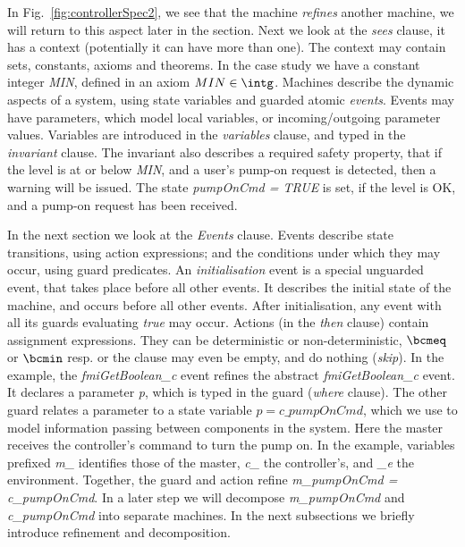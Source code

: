 \documentclass{llncs}%
\begin{document}
 In Fig.~\ref{fig:controllerSpec2}, we see that the machine \emph{refines} another machine, we will return to this aspect later in the section. Next we look at the \emph{sees} clause, it has a context (potentially it can have more than one). The context may contain sets, constants, axioms and theorems. In the case study we have a constant integer \emph{MIN}, defined in an axiom $MIN \in \intg$. Machines describe the dynamic aspects of a system, using state variables and guarded atomic \emph{events}. Events may have parameters, which model local variables, or incoming/outgoing parameter values. Variables are introduced in the \emph{variables} clause, and typed in the \emph{invariant} clause. The invariant also describes a required safety property, that if the level is at or below \emph{MIN}, and a user's pump-on request is detected, then a warning will be issued. The state \emph{pumpOnCmd = TRUE} is set, if the level is OK, and a pump-on request has been received.

In the next section we look at the \emph{Events} clause. Events describe state transitions, using action expressions; and the conditions under which they may occur, using guard predicates. An \emph{initialisation} event is a special unguarded event, that takes place before all other events. It describes the initial state of the machine, and occurs before all other events. After initialisation, any event with all its guards evaluating \emph{true} may occur. Actions (in the \emph{then} clause) contain assignment expressions. They can be deterministic or non-deterministic, $\bcmeq$ or $\bcmin$ resp. or the clause may even be empty, and do nothing (\emph{skip}). In the example, the \emph{fmiGetBoolean\_c} event refines the abstract \emph{fmiGetBoolean\_c} event. It declares a parameter \emph{p}, which is typed in the guard (\emph{where} clause). The other guard relates a parameter to a state variable $p = c\_pumpOnCmd$, which we use to model information passing between components in the system. Here the master receives the controller’s command to turn the pump on. In the example, variables prefixed \emph{m\_} identifies those of the master, \emph{c\_} the controller's, and \emph{\_e} the environment. Together, the guard and action refine \emph{m\_pumpOnCmd = c\_pumpOnCmd}. In a later step we will decompose \emph{m\_pumpOnCmd} and \emph{c\_pumpOnCmd} into separate machines. In the next subsections we briefly introduce refinement and decomposition.
\end{document}
